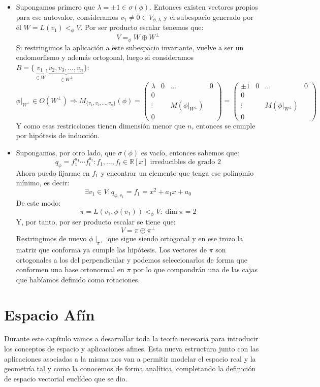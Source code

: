 \documentclass[10pt,a4paper,openright]{book}
\theoremstyle{break}
\begin{document}
\begin{itemize}
\item Supongamos primero que $\lambda = \pm 1 \in \sigma(\phi)$. Entonces existen vectores propios para ese autovalor, consideramos $v_1 \neq 0 \in V_{\phi, \lambda}$ y el subespacio generado por él $W = L(v_1) <_\phi V$. Por ser producto escalar tenemos que:
$$V =_\phi W \oplus W^\perp$$
Si restringimos la aplicación a este subespacio invariante, vuelve a ser un endomorfismo y además ortogonal, luego si consideramos $B=\{\underbrace{v_1}_{\in W}, \underbrace{v_2, v_3, \ldots, v_n}_{\in W^\perp}\}$:
$$\phi|_{W^\perp}\in O(W^\perp)\Rightarrow M_{\{v_1,v_2,\ldots , v_n\}} (\phi) =
\left(
\begin{array}{c|ccc}
\lambda & 0 & \ldots & 0 \\
\hline
0  & & &  \\
\vdots & & M(\phi|_{W^\perp}) & \\
0 & & &
\end{array}
\right) = \left(
\begin{array}{c|ccc}
\pm 1 & 0 & \ldots & 0 \\
\hline
0  & & &  \\
\vdots & & M(\phi|_{W^\perp}) & \\
0 & & &
\end{array}
\right) $$
Y como esas restricciones tienen dimensión menor que $n$, entonces se cumple  por hipótesis de inducción.

\item Supongamos, por otro lado, que $\sigma (\phi)$ es vacío, entonces sabemos que:
$$q_\phi = f_1^{a_1} \cdots f_t^{a_t}: f_1, \ldots, f_t \in \mathbb{R}[x] \mbox{ irreducibles de grado } 2$$
Ahora puedo fijarme en $f_{1}$ y encontrar un elemento que tenga ese polinomio mínimo, es decir:
$$\exists v_1\in V: q_{\phi, v_1} = f_1 = x^2+a_1x+a_0$$
De este modo:
$$\pi = L(v_1, \phi(v_1))<_\phi V: \dim \pi = 2$$
Y, por tanto, por ser producto escalar se tiene que:
$$V = \pi \oplus \pi^\perp$$
Restringimos de nuevo $\phi\mid_{\pi^\perp}$ que sigue siendo ortogonal y en ese trozo la matriz que conforma ya cumple las hipótesis. Los vectores de $\pi$ son ortogonales a los del perpendicular y podemos seleccionarlos de forma que conformen una base ortonormal en $\pi$ por lo que compondrán una de las cajas que habíamos definido como rotaciones.
\end{itemize}

\chapter{Espacio Afín}
Durante este capítulo vamos a desarrollar toda la teoría necesaria para introducir los conceptos de espacio y aplicaciones afines. Esta nueva estructura junto con las aplicaciones asociadas a la misma nos van a permitir modelar el espacio real y la geometría tal y como la conocemos de forma analítica, completando la definición de espacio vectorial euclídeo que se dio.
\end{document}
